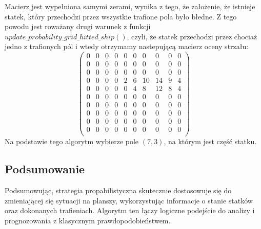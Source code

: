 \documentclass[magisterska]{pracadypl}
\begin{document}
Macierz jest wypełniona samymi zerami, wynika z tego, że założenie, że istnieje statek, który przechodzi przez wszystkie trafione pola było błedne. Z tego powodu jest roważany drugi warunek z funkcji $update\_probability\_grid\_hitted\_ship()$, czyli, że statek przechodzi przez chociaż jedno z trafionych pól i wtedy otrzymamy nastepującą macierz oceny strzału:
$$
\begin{pmatrix}
0 & 0 & 0 & 0 & 0 & 0 & 0 & 0 & 0 & 0 \\
0 & 0 & 0 & 0 & 0 & 0 & 0 & 0 & 0 & 0 \\
0 & 0 & 0 & 0 & 0 & 0 & 0 & 0 & 0 & 0 \\
0 & 0 & 0 & 0 & 2 & 6 & 10 & 14 & 9 & 4 \\
0 & 0 & 0 & 0 & 0 & 4 & 8 & 12 & 8 & 4 \\
0 & 0 & 0 & 0 & 0 & 0 & 0 & 0 & 0 & 0 \\
0 & 0 & 0 & 0 & 0 & 0 & 0 & 0 & 0 & 0 \\
0 & 0 & 0 & 0 & 0 & 0 & 0 & 0 & 0 & 0 \\
0 & 0 & 0 & 0 & 0 & 0 & 0 & 0 & 0 & 0 \\
0 & 0 & 0 & 0 & 0 & 0 & 0 & 0 & 0 & 0 \\
\end{pmatrix}
$$
Na podstawie tego algorytm wybierze pole $(7,3)$, na którym jest część statku.

\subsection{Podsumowanie}
Podsumowując, strategia propabilistyczna skutecznie dostosowuje się do zmieniającej się sytuacji na planszy, wykorzystując informacje o stanie statków oraz dokonanych trafieniach. Algorytm ten łączy logiczne podejście do analizy i prognozowania z klasycznym prawdopodobieństwem.
\end{document}
